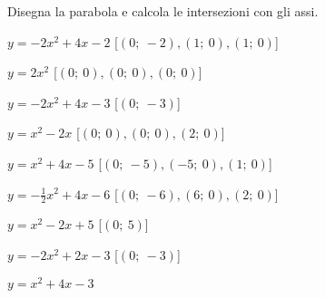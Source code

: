 \begin{esercizio}\label{ese:}
 Disegna la parabola e calcola le intersezioni con gli assi.
 \begin{enumeratea}
  \item  \(y=-2 x^2 +4 x -2\)
   \hfill [\(\left (0;~-2 \right ), \left(1;~0 \right), \left(1;~0 \right)\)]
  \item  \(y=2 x^2 \)
   \hfill [\(\left (0;~0 \right ), \left(0;~0 \right), \left(0;~0 \right)\)]
  \item  \(y=-2 x^2 +4 x -3\)
   \hfill [\(\left (0;~-3 \right )\)]
  \item  \(y=x^2 -2 x \)
   \hfill [\(\left (0;~0 \right ), \left(0;~0 \right), \left(2;~0 \right)\)]
  \item  \(y=x^2 +4 x -5\)
   \hfill [\(\left (0;~-5 \right ), \left(-5;~0 \right), \left(1;~0 \right)\)]
  \item  \(y=-\frac{1}{2} x^2 +4 x -6\)
   \hfill [\(\left (0;~-6 \right ), \left(6;~0 \right), \left(2;~0 \right)\)]
  \item  \(y=x^2 -2 x +5\)
   \hfill [\(\left (0;~5 \right )\)]
  \item  \(y=-2 x^2 +2 x -3\)
   \hfill [\(\left (0;~-3 \right )\)]
  \item  \(y=x^2 +4 x -3\)

\end{enumeratea}
\end{esercizio}
